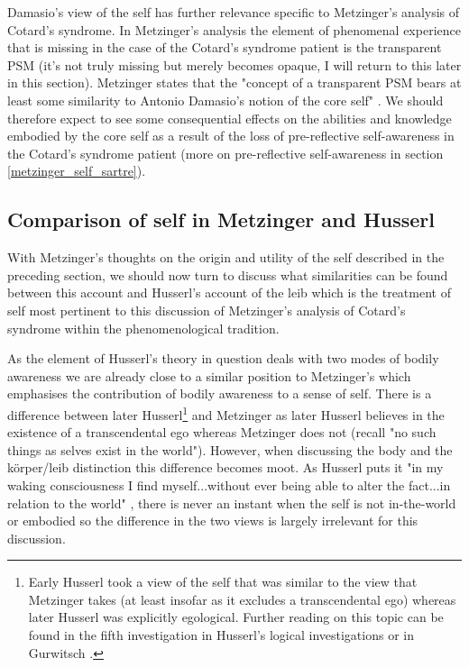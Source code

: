 Damasio's view of the self has further relevance specific to Metzinger's analysis of Cotard's syndrome. In Metzinger's analysis the element of phenomenal experience that is missing in the case of the Cotard's syndrome patient is the transparent PSM (it's not truly missing but merely becomes opaque, I will return to this later in this section). Metzinger states that the "concept of a transparent PSM bears at least some similarity to Antonio Damasio's notion of the core self" \cite[p. 340]{metzinger2003}. We should therefore expect to see some consequential effects on the abilities and knowledge embodied by the core self as a result of the loss of pre-reflective self-awareness in the Cotard's syndrome patient (more on pre-reflective self-awareness in section \ref{metzinger_self_sartre}).

\subsection{Comparison of self in Metzinger and Husserl}
\label{metzinger_self_husserl}

With Metzinger's thoughts on the origin and utility of the self described in the preceding section, we should now turn to discuss what similarities can be found between this account and Husserl's account of the leib which is the treatment of self most pertinent to this discussion of Metzinger's analysis of Cotard's syndrome within the phenomenological tradition.

As the element of Husserl's theory in question deals with two modes of bodily awareness we are already close to a similar position to Metzinger's which emphasises the contribution of bodily awareness to a sense of self. There is a difference between later Husserl\footnote{Early Husserl \cite{husserl2001shorter} took a view of the self that was similar to the view that Metzinger takes (at least insofar as it excludes a transcendental ego) whereas later Husserl was explicitly egological. Further reading on this topic can be found in the fifth investigation in Husserl's logical investigations or in Gurwitsch \cite[pp. 287-300]{gurwitsch1966nonegological}.} and Metzinger as later Husserl believes in the existence of a transcendental ego whereas Metzinger does not (recall "no such things as selves exist in the world"). However, when discussing the body and the k\"{o}rper/leib distinction this difference becomes moot. As Husserl puts it "in my waking consciousness I find myself...without ever being able to alter the fact...in relation to the world" \cite[p. 53]{husserl1931}, there is never an instant when the self is not in-the-world or embodied so the difference in the two views is largely irrelevant for this discussion.

